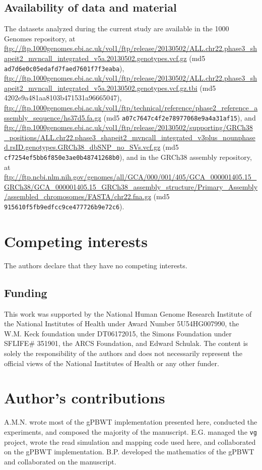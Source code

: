 \subsection{Availability of data and material}
The datasets analyzed during the current study are available in the 1000 Genomes repository, at \url{ftp://ftp.1000genomes.ebi.ac.uk/vol1/ftp/release/20130502/ALL.chr22.phase3_shapeit2_mvncall_integrated_v5a.20130502.genotypes.vcf.gz} (md5 \texttt{ad7d6e0c05edafd7faed7601f7f3eaba}), \url{ftp://ftp.1000genomes.ebi.ac.uk/vol1/ftp/release/20130502/ALL.chr22.phase3_shapeit2_mvncall_integrated_v5a.20130502.genotypes.vcf.gz.tbi} (md5 4202e9a481aa8103b471531a96665047), \url{ftp://ftp.1000genomes.ebi.ac.uk/vol1/ftp/technical/reference/phase2_reference_assembly_sequence/hs37d5.fa.gz} (md5 \texttt{a07c7647c4f2e78977068e9a4a31af15}), and \url{ftp://ftp.1000genomes.ebi.ac.uk/vol1/ftp/release/20130502/supporting/GRCh38_positions/ALL.chr22.phase3_shapeit2_mvncall_integrated_v3plus_nounphased.rsID.genotypes.GRCh38_dbSNP_no_SVs.vcf.gz} (md5 \texttt{cf7254ef5bb6f850e3ae0b48741268b0}), and in the GRCh38 assembly repository, at \url{ftp://ftp.ncbi.nlm.nih.gov/genomes/all/GCA/000/001/405/GCA_000001405.15_GRCh38/GCA_000001405.15_GRCh38_assembly_structure/Primary_Assembly/assembled_chromosomes/FASTA/chr22.fna.gz} (md5 \texttt{915610f5fb9edfcc9ce477726b9e72c6}).

\section{Competing interests}
The authors declare that they have no competing interests.

\subsection{Funding}
This work was supported by the National Human Genome Research Institute of the National Institutes of Health under Award Number 5U54HG007990, the W.M. Keck foundation under DT06172015, the Simons Foundation under SFLIFE\# 351901, the ARCS Foundation, and Edward Schulak. The content is solely the responsibility of the authors and does not necessarily represent the official views of the National Institutes of Health or any other funder.

\section{Author's contributions}
    A.M.N. wrote most of the gPBWT implementation presented here, conducted the experiments, and composed the majority of the manuscript. E.G. managed the \texttt{vg} project, wrote the read simulation and mapping code used here, and collaborated on the gPBWT implementation. B.P. developed the mathematics of the gPBWT and collaborated on the manuscript.

